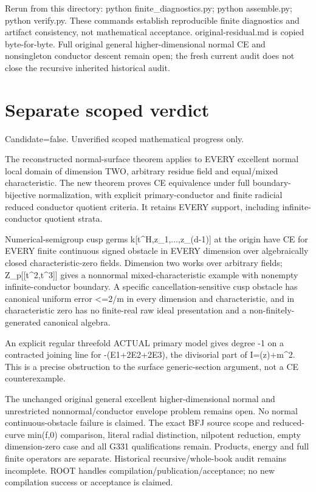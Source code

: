 \documentclass[11pt]{article}
\begin{document}
Rerun from this directory: python finite\_diagnostics.py; python assemble.py; python verify.py. These commands establish reproducible finite diagnostics and artifact consistency, not mathematical acceptance. original-residual.md is copied byte-for-byte. Full original general higher-dimensional normal CE and nonsingleton conductor descent remain open; the fresh current audit does not close the recursive inherited historical audit.

\section*{Separate scoped verdict}
Candidate=false. Unverified scoped mathematical progress only.

The reconstructed normal-surface theorem applies to EVERY excellent normal local domain of dimension TWO, arbitrary residue field and equal/mixed characteristic. The new theorem proves CE equivalence under full boundary-bijective normalization, with explicit primary-conductor and finite radicial reduced conductor quotient criteria. It retains EVERY support, including infinite-conductor quotient strata.

Numerical-semigroup cusp germs k[t\textasciicircum{}H,z\_1,...,z\_(d-1)] at the origin have CE for EVERY finite continuous signed obstacle in EVERY dimension over algebraically closed characteristic-zero fields. Dimension two works over arbitrary fields; Z\_p[[t\textasciicircum{}2,t\textasciicircum{}3]] gives a nonnormal mixed-characteristic example with nonempty infinite-conductor boundary. A specific cancellation-sensitive cusp obstacle has canonical uniform error \textless{}=2/m in every dimension and characteristic, and in characteristic zero has no finite-real raw ideal presentation and a non-finitely-generated canonical algebra.

An explicit regular threefold ACTUAL primary model gives degree -1 on a contracted joining line for -(E1+2E2+2E3), the divisorial part of I=(z)+m\textasciicircum{}2. This is a precise obstruction to the surface generic-section argument, not a CE counterexample.

The unchanged original general excellent higher-dimensional normal and unrestricted nonnormal/conductor envelope problem remains open. No normal continuous-obstacle failure is claimed. The exact BFJ source scope and reduced-curve min(f,0) comparison, literal radial distinction, nilpotent reduction, empty dimension-zero case and all G331 qualifications remain. Products, energy and full finite operators are separate. Historical recursive/whole-book audit remains incomplete. ROOT handles compilation/publication/acceptance; no new compilation success or acceptance is claimed.
\end{document}
